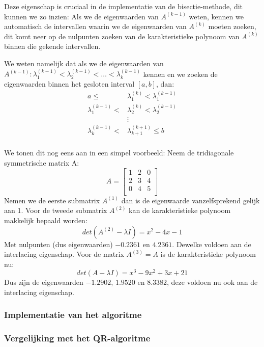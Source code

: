 \documentclass[a4paper]{article}
\begin{document}
	Deze eigenschap is cruciaal in de implementatie van de bisectie-methode, dit kunnen we zo inzien:
	Als we de eigenwaarden van $A^{(k-1)}$ weten, kennen we automatisch de intervallen waarin we de eigenwaarden van $A^{(k)}$ moeten zoeken, dit komt neer op de nulpunten zoeken van de karakteristieke polynoom van $A^{(k)}$ binnen die gekende intervallen.
	
	\noindent We weten namelijk dat als we de eigenwaarden van $A^{(k-1)}: \lambda _1^{(k-1)} < \lambda _2^{(k-1)} < \dots < \lambda _k^{(k-1)}$ kennen en we zoeken de eigenwaarden binnen het gesloten interval $[a,b]$, dan:
	\begin{align*}
		a \le &\lambda_1^{(k)} < \lambda_1^{(k-1)}\\
		\lambda_1^{(k-1)} < &\lambda_2^{(k)} < \lambda_2^{(k-1)}\\
		&\vdots\\
		\lambda _k^{(k-1)} < &\lambda _{k+1}^{(k+1)} \le b\\
	\end{align*}
	
	We tonen dit nog eens aan in een simpel voorbeeld: 
	Neem de tridiagonale symmetrische matrix A:
	\[ A =
		\begin{bmatrix*}
			1 & 2 & 0 \\
			2 & 3 & 4 \\
			0 & 4 & 5 \\ 
		\end{bmatrix*}
	\]
	Nemen we de eerste submatrix $A^{(1)}$ dan is de eigenwaarde vanzelfsprekend gelijk aan 1.
	Voor de tweede submatrix $A^{(2)}$ kan de karakteristieke polynoom makkelijk bepaald worden: 
	\[
		det(A^{(2)} - \lambda I) = x^2 - 4x - 1 
	\]
	Met nulpunten (dus eigenwaarden) $-0.2361$ en $4.2361$. Dewelke voldoen aan de interlacing eigenschap.
	Voor de matrix $A^{(3)} = A$ is de karakteristieke polynoom nu:
	\[
		det(A - \lambda I) = x^3 -9x^2 + 3x + 21
	\]
	Dus zijn de eigenwaarden $-1.2902$, $1.9520$ en $8.3382$, deze voldoen nu ook aan de interlacing eigenschap.
		
\subsubsection{Implementatie van het algoritme}
\subsubsection{Vergelijking met het QR-algoritme}
\end{document}
